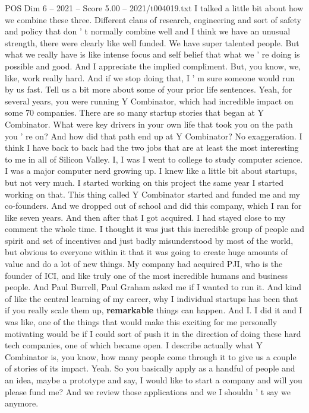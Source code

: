 \begin{textsample}{POS Dim 6 – 2021 – Score 5.00 – 2021/t004019.txt}
I talked a little bit about how we combine these three.
Different clans of research, engineering and sort of safety and policy that don ' t normally combine well and I think we have an unusual strength, there were clearly like well funded.
We have super talented people.
But what we really have is like intense focus and self belief that what we ' re doing is possible and good.
And I appreciate the implied compliment.
But, you know, we, like, work really hard.
And if we stop doing that, I ' m sure someone would run by us fast.
Tell us a bit more about some of your prior life sentences.
Yeah, for several years, you were running Y Combinator, which had incredible impact on some 70 companies.
There are so many startup stories that began at Y Combinator.
What were key drivers in your own life that took you on the path you ' re on?
And how did that path end up at Y Combinator?
No exaggeration.
I think I have back to back had the two jobs that are at least the most interesting to me in all of Silicon Valley.
I, I was I went to college to study computer science.
I was a major computer nerd growing up.
I knew like a little bit about startups, but not very much.
I started working on this project the same year I started working on that.
This thing called Y Combinator started and funded me and my co-founders.
And we dropped out of school and did this company, which I ran for like seven years.
And then after that I got acquired.
I had stayed close to my comment the whole time.
I thought it was just this incredible group of people and spirit and set of incentives and just badly misunderstood by most of the world, but obvious to everyone within it that it was going to create huge amounts of value and do a lot of new things.
My company had acquired PJI, who is the founder of ICI, and like truly one of the most incredible humans and business people.
And Paul Burrell, Paul Graham asked me if I wanted to run it.
And kind of like the central learning of my career, why I individual startups has been that if you really scale them up, \textbf{remarkable} things can happen.
And I.
I did it and I was like, one of the things that would make this exciting for me personally motivating would be if I could sort of push it in the direction of doing these hard tech companies, one of which became open.
I describe actually what Y Combinator is, you know, how many people come through it to give us a couple of stories of its impact.
Yeah.
So you basically apply as a handful of people and an idea, maybe a prototype and say, I would like to start a company and will you please fund me?
And we review those applications and we I shouldn ' t say we anymore.

\end{textsample}
